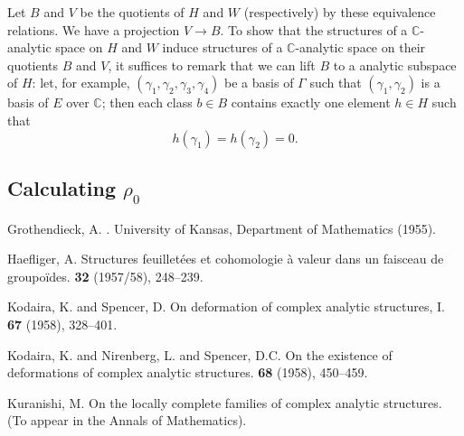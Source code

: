 \documentclass{article}
\newcommand{\CC}{\mathbb{C}}
\begin{document}
Let $B$ and $V$ be the quotients of $H$ and $W$ (respectively) by these equivalence relations.
We have a projection $V\to B$.
To show that the structures of a $\CC$-analytic space on $H$ and $W$ induce structures of a $\CC$-analytic space on their quotients $B$ and $V$, it suffices to remark that we can lift $B$ to a analytic subspace of $H$: let, for example, $(\gamma_1,\gamma_2,\gamma_3,\gamma_4)$ be a basis of $\Gamma$ such that $(\gamma_1,\gamma_2)$ is a basis of $E$ over $\CC$; then each class $b\in B$ contains exactly one element $h\in H$ such that
\[
  h(\gamma_1) = h(\gamma_2) = 0.
\]


\subsection{Calculating \texorpdfstring{$\rho_0$}{rho0}}
\label{III.3}






\nocite{*}

\begin{thebibliography}{5}

  {\sc Grothendieck, A.}
  .
  \newblock University of Kansas, Department of Mathematics (1955).

  {\sc Haefliger, A.}
  \newblock Structures feuillet\'{e}es et cohomologie \`{a} valeur dans un faisceau de groupo\"{i}des.
   \textbf{32} (1957/58), 248--239.

  {\sc Kodaira, K. and Spencer, D.}
  \newblock On deformation of complex analytic structures, I.
   \textbf{67} (1958), 328--401.

  {\sc Kodaira, K. and Nirenberg, L. and Spencer, D.C.}
  \newblock On the existence of deformations of complex analytic structures.
   \textbf{68} (1958), 450--459.

  {\sc Kuranishi, M.}
  \newblock On the locally complete families of complex analytic structures.
  \newblock (To appear in the Annals of Mathematics).

\end{thebibliography}
\end{document}
